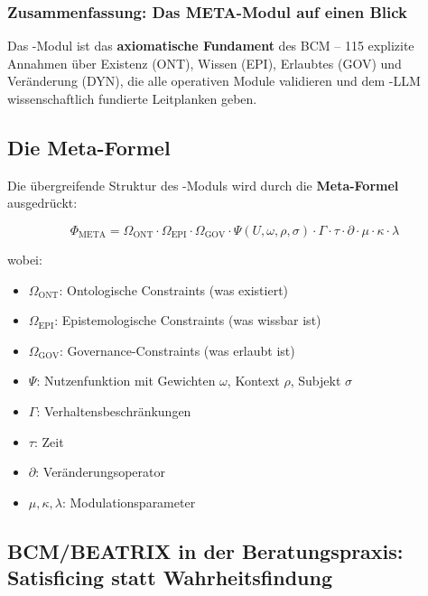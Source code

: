 \subsubsection{Zusammenfassung: Das META-Modul auf einen Blick}

\begin{tcolorbox}[colback=blue!5!white, colframe=blue!75!black, title=Das META-Modul in einem Satz]
Das \META-Modul ist das \textbf{axiomatische Fundament} des BCM -- 115 explizite Annahmen über Existenz (ONT), Wissen (EPI), Erlaubtes (GOV) und Veränderung (DYN), die alle operativen Module validieren und dem \BEATRIX-LLM wissenschaftlich fundierte Leitplanken geben.
\end{tcolorbox}

\subsection{Die Meta-Formel}

Die übergreifende Struktur des \META-Moduls wird durch die \textbf{Meta-Formel} ausgedrückt:

\begin{equation}
\Phi_{\text{META}} = \Omega_{\text{ONT}} \cdot \Omega_{\text{EPI}} \cdot \Omega_{\text{GOV}} \cdot \Psi(U, \omega, \rho, \sigma) \cdot \Gamma \cdot \tau \cdot \partial \cdot \mu \cdot \kappa \cdot \lambda
\label{eq:meta_formula}
\end{equation}

wobei:
\begin{itemize}
    \item $\Omega_{\text{ONT}}$: Ontologische Constraints (was existiert)
    \item $\Omega_{\text{EPI}}$: Epistemologische Constraints (was wissbar ist)
    \item $\Omega_{\text{GOV}}$: Governance-Constraints (was erlaubt ist)
    \item $\Psi$: Nutzenfunktion mit Gewichten $\omega$, Kontext $\rho$, Subjekt $\sigma$
    \item $\Gamma$: Verhaltensbeschränkungen
    \item $\tau$: Zeit
    \item $\partial$: Veränderungsoperator
    \item $\mu, \kappa, \lambda$: Modulationsparameter
\end{itemize}

\subsection{BCM/BEATRIX in der Beratungspraxis: Satisficing statt Wahrheitsfindung}

